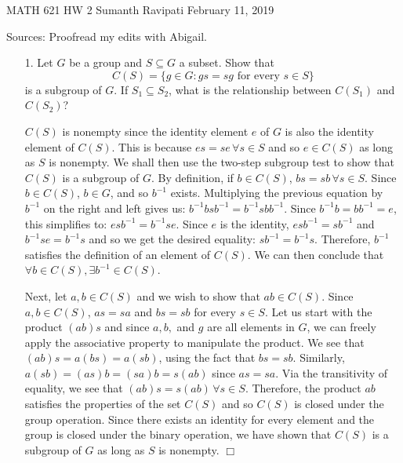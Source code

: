 \documentclass[12pt,letterpaper,reqno]{amsart}
\begin{document}
\thispagestyle{empty}
\begin{center}\large{
    MATH 621\quad
    HW 2\quad
    Sumanth Ravipati\quad
    February 11, 2019}
\end{center}
\vspace{.15in}
\begin{flushleft}
Sources: Proofread my edits with Abigail.
\end{flushleft}
\vspace{.25in}

\begin{enumerate}
\item[1.] Let $G$ be a group and $S \subseteq G$ a subset. Show that
$$C ( S ) = \{ g \in G : g s = s g \text { for every } s \in S \}$$
is a subgroup of $G$. If $S_1 \subseteq S_2$, what is the relationship between $C(S_1)$ and $C(S_2)$?
\newline

\begin{flushleft}
$C(S)$ is nonempty since the identity element $e$ of $G$ is also the identity element of $C(S)$. This is because $es = se\, \forall s \in S$ and so $e \in C(S)$ as long as $S$ is nonempty. We shall then use the two-step subgroup test to show that $C(S)$ is a subgroup of $G$. By definition, if $b \in C(S)$, $bs = sb\, \forall s \in S$. Since $b \in C(S)$, $b \in G$, and so $b^{-1}$ exists. Multiplying the previous equation by $b^{-1}$ on the right and left gives us: $b^{-1}bsb^{-1} = b^{-1}sbb^{-1}$. Since $b^{-1}b = bb^{-1} = e$, this simplifies to: $esb^{-1} = b^{-1}se$. Since $e$ is the identity, $esb^{-1} = sb^{-1}$ and $b^{-1}se = b^{-1}s$ and so we get the desired equality: $sb^{-1} = b^{-1}s$. Therefore, $b^{-1}$ satisfies the definition of an element of $C(S)$. We can then conclude that $\forall b \in C(S), \exists b^{-1} \in C(S)$.
\newline

Next, let $a, b \in C(S)$ and we wish to show that $ab \in C(S)$. Since $a,b \in C(S)$, $as = sa$ and $bs = sb$ for every $s \in S$. Let us start with the product $(ab)s$ and since $a, b,$ and $g$ are all elements in $G$, we can freely apply the associative property to manipulate the product. We see that $(ab)s = a(bs) = a(sb)$, using the fact that $bs = sb$. Similarly, $a(sb) = (as)b = (sa)b = s(ab)$ since $as = sa$. Via the transitivity of equality, we see that $(ab)s = s(ab)\, \forall s \in S$. Therefore, the product $ab$ satisfies the properties of the set $C(S)$ and so $C(S)$ is closed under the group operation. Since there exists an identity for every element and the group is closed under the binary operation, we have shown that $C(S)$ is a subgroup of $G$ as long as $S$ is nonempty. $\Box$
\newline


\end{flushleft}
\end{enumerate}
\end{document}
